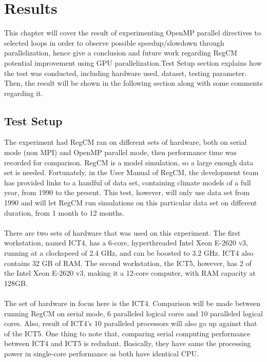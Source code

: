 \chapter{Results}

This chapter will cover the result of experimenting OpenMP parallel directives to selected loops in order to observe possible speedup/slowdown through parallelization, hence give a conclusion and future work regarding RegCM potential improvement using GPU parallelization.Test Setup section explains how the test was conducted, including hardware used, dataset, testing parameter. Then, the result will be shown in the following section along with some comments regarding it. \\

\section{Test Setup}

The experiment had RegCM ran on different sets of hardware, both on serial mode (non MPI) and OpenMP parallel mode, then performance time was recorded for comparison. RegCM is a model simulation, so a large enough data set is needed. Fortunately, in the User Manual of RegCM, the development team has provided links to a handful of data set, containing climate models of a full year, from 1990 to the present. This test, however, will only use data set from 1990 and will let RegCM run simulations on this particular data set on different duration, from 1 month to 12 months. \\
~\\
There are two sets of hardware that was used on this experiment. The first workstation, named ICT4, has a 6-core, hyperthreaded Intel Xeon E-2620 v3, running at a clockspeed of 2.4 GHz, and can be boosted to 3.2 GHz. ICT4 also contains 32 GB of RAM. The second workstation, the ICT5, however, has 2 of the Intel Xeon E-2620 v3, making it a 12-core computer, with RAM capacity at 128GB. \\
~\\
The set of hardware in focus here is the ICT4. Comparison will be made between running RegCM on serial mode, 6 paralleled logical cores and 10 paralleled logical cores. Also, result of ICT4's 10 paralleled processors will also go up against that of the ICT5. One thing to note that, comparing serial computing performance between ICT4 and ICT5 is redudant. Basically, they have same the processing power in single-core performance as both have identical CPU. \\

